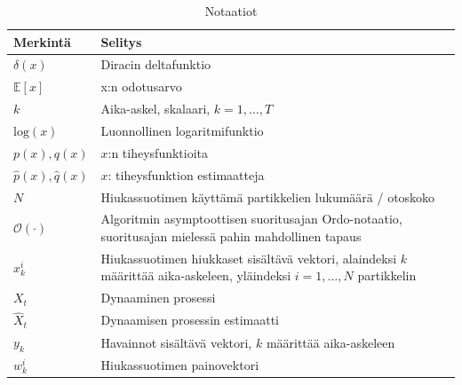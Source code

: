 \documentclass[
  12pt,
  a4paper, twoside]{book}
\begin{document}
\begin{table}

\caption{\label{tab:notaatiot}Notaatiot}
\centering
\begin{tabular}[t]{ll}
\toprule
Merkintä & Selitys\\
\midrule
$\delta(x)$ & Diracin deltafunktio\\
$\mathbb{E}[x]$ & x:n odotusarvo\\
$k$ & Aika-askel, skalaari, $k={1,\ldots,T}$\\
$\text{log}(x)$ & Luonnollinen logaritmifunktio\\
$p(x), q(x)$ & $x$:n tiheysfunktioita\\
\addlinespace
$\hat{p}(x), \hat{q}(x)$ & $x$: tiheysfunktion estimaatteja\\
$N$ & Hiukassuotimen käyttämä partikkelien lukumäärä / otoskoko\\
$\mathcal{O}(\cdot)$ & \makecell[l]{Algoritmin asymptoottisen suoritusajan Ordo-notaatio,\\suoritusajan mielessä pahin mahdollinen tapaus}\\
$x^i_k$ & \makecell[l]{Hiukassuotimen hiukkaset sisältävä vektori,\\alaindeksi $k$ määrittää aika-askeleen,\\yläindeksi $i={1,\ldots,N}$ partikkelin}\\
$X_t$ & Dynaaminen prosessi\\
\addlinespace
$\hat{X}_t$ & Dynaamisen prosessin estimaatti\\
$y_k$ & Havainnot sisältävä vektori, $k$ määrittää aika-askeleen\\
$w^i_k$ & Hiukassuotimen painovektori\\
\bottomrule
\end{tabular}
\end{table}
\end{document}
